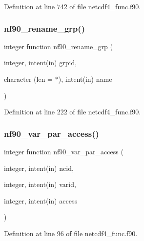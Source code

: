Definition at line 742 of file netcdf4\+\_\+func.\+f90.

\mbox{\label{netcdf4__func_8f90_a8d795381e7888daee2428ba0c29591d0}} 
\subsubsection{\texorpdfstring{nf90\+\_\+rename\+\_\+grp()}{nf90\_rename\_grp()}}
{\footnotesize\ttfamily integer function nf90\+\_\+rename\+\_\+grp (\begin{DoxyParamCaption}\item[{integer, intent(in)}]{grpid,  }\item[{character (len = $\ast$), intent(in)}]{name }\end{DoxyParamCaption})}



Definition at line 222 of file netcdf4\+\_\+func.\+f90.

\mbox{\label{netcdf4__func_8f90_a57224e8f3d445359fbbb405d796445e6}} 
\subsubsection{\texorpdfstring{nf90\+\_\+var\+\_\+par\+\_\+access()}{nf90\_var\_par\_access()}}
{\footnotesize\ttfamily integer function nf90\+\_\+var\+\_\+par\+\_\+access (\begin{DoxyParamCaption}\item[{integer, intent(in)}]{ncid,  }\item[{integer, intent(in)}]{varid,  }\item[{integer, intent(in)}]{access }\end{DoxyParamCaption})}



Definition at line 96 of file netcdf4\+\_\+func.\+f90.

